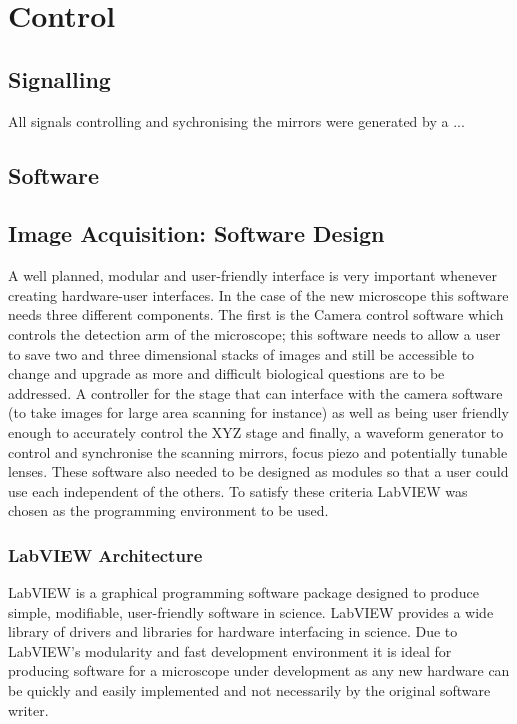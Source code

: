 \section{Control}
\subsection{Signalling}

All signals controlling and sychronising the mirrors were generated by a ... %

\subsection{Software}

%

\subsection{Image Acquisition: Software Design}

A well planned, modular and user-friendly interface is very important whenever creating hardware-user interfaces.
In the case of the new microscope this software needs three different components.
The first is the Camera control software which controls the detection arm of the microscope; this software needs to allow a user to save two and three dimensional stacks of images and still be accessible to change and upgrade as more and difficult biological questions are to be addressed.
A controller for the stage that can interface with the camera software (to take images for large area scanning for instance) as well as being user friendly enough to accurately control the XYZ stage and finally, a waveform generator to control and synchronise the scanning mirrors, focus piezo and potentially tunable lenses.
These software also needed to be designed as modules so that a user could use each independent of the others.
To satisfy these criteria LabVIEW was chosen as the programming environment to be used.

\subsubsection{LabVIEW Architecture}

LabVIEW is a graphical programming software package designed to produce simple, modifiable, user-friendly software in science.
LabVIEW provides a wide library of drivers and libraries for hardware interfacing in science.
Due to LabVIEW's modularity and fast development environment it is ideal for producing software for a microscope under development as any new hardware can be quickly and easily implemented and not necessarily by the original software writer.

